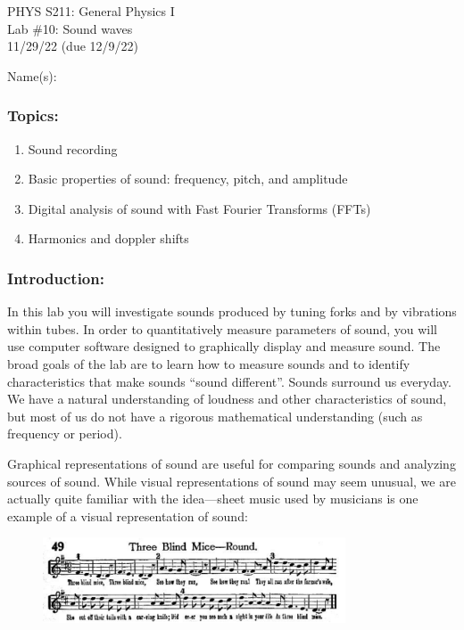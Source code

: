 \documentclass[11pt,letterpaper]{article}
\begin{document}
\setlength{\parindent}{0in}



\begin{flushright}
  PHYS S211: General Physics I\\
  Lab \#10: Sound waves\\
11/29/22 (due 12/9/22)
\end{flushright}

Name(s):\\

\subsubsection*{Topics:}
\begin{enumerate}
\setlength{\parskip}{3pt}
\item Sound recording
\item Basic properties of sound: frequency, pitch, and amplitude
\item Digital analysis of sound with Fast Fourier Transforms (FFTs)
\item Harmonics and doppler shifts
\end{enumerate}

\subsubsection*{Introduction:}
In this lab you will investigate sounds produced by tuning forks and by vibrations within tubes.  In order to quantitatively measure parameters of sound, you will use computer software designed to graphically display and measure sound. The broad goals of the lab are to learn
how to measure sounds and to identify characteristics that make sounds ``sound different''. Sounds surround us everyday. We have a natural understanding of loudness and other characteristics of sound, but most of us do not have a rigorous mathematical understanding (such as frequency or period).  

Graphical representations of sound are useful for comparing sounds and analyzing sources of sound.  While visual representations of sound may seem unusual, we are actually quite familiar with the idea---sheet music used by musicians is one example of a visual representation of sound:

\begin{figure}[h]
\begin{center}
\includegraphics[width=0.8\textwidth]{./ThreeBlindMice}
\end{center}
\end{figure}
\end{document}
